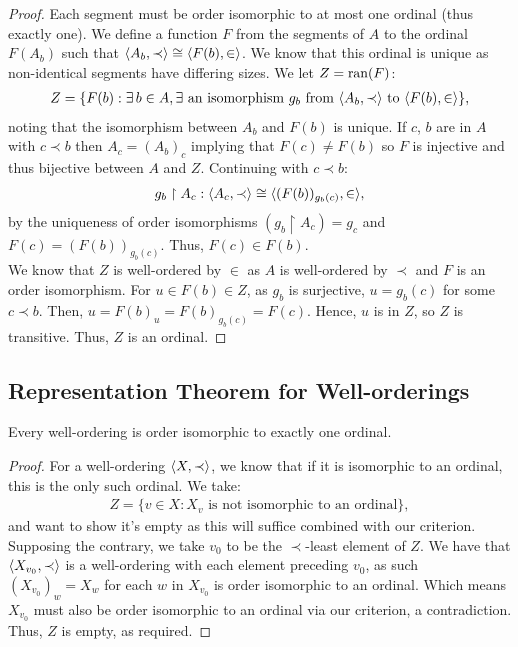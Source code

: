 \begin{proof}
    Each segment must be order isomorphic to at most one
    ordinal (thus exactly one). We define a function $F$ from
    the segments of $A$ to the ordinal $F(A_b)$ such
    that $\langle A_b, \prec \rangle \cong \langle F(b), \in \rangle$.
    We know that this ordinal is unique as non-identical
    segments have differing sizes.
    We let $Z = \operatorname{ran}(F)$: \begin{align*}
        Z = \{F(b) : \exists \, b \in A, 
        \exists \text{ an isomorphism } g_b 
        \text{ from } \langle A_b, \prec \rangle 
        \text{ to } \langle F(b), \in \rangle\},
    \end{align*} noting that the isomorphism between
    $A_b$ and $F(b)$ is unique. If $c$, $b$ are in $A$ with
    $c \prec b$ then $A_c = (A_b)_c$ implying that
    $F(c) \neq F(b)$ so $F$ is injective and thus bijective
    between $A$ and $Z$.
    Continuing with $c \prec b$: \begin{align*}
        g_b \upharpoonright A_c :
        \langle A_c, \prec \rangle \cong 
        \langle (F(b))_{g_b(c)}, \in \rangle,
    \end{align*} by the uniqueness of order isomorphisms
    $(g_b \upharpoonright A_c) = g_c$ and $F(c) = (F(b))_{g_b(c)}$.
    Thus, $F(c) \in F(b)$.
    \\[\baselineskip]
    We know that $Z$ is well-ordered by $\in$ as 
    $A$ is well-ordered by $\prec$ and $F$ is an
    order isomorphism. For $u \in F(b) \in Z$,
    as $g_b$ is surjective, $u = g_b(c)$ for some $c \prec b$.
    Then, $u = F(b)_u = F(b)_{g_b(c)} = F(c)$. Hence, $u$ is
    in $Z$, so $Z$ is transitive. Thus, $Z$ is an ordinal.
\end{proof}

\newpage

\subsection{Representation Theorem for Well-orderings}

Every well-ordering is order isomorphic to 
exactly one ordinal.

\begin{proof}
    For a well-ordering $\langle X, \prec \rangle$, we know that if it
    is isomorphic to an ordinal, this is the only such ordinal.
    We take: \begin{align*}
        Z = \{v \in X : X_v \text{ is not isomorphic to an ordinal}\},
    \end{align*} and want to show it's empty as this will suffice
    combined with our criterion. Supposing the
    contrary, we take $v_0$ to be the $\prec$-least element
    of $Z$. We have that $\langle X_{v_0}, \prec \rangle$ is a well-ordering
    with each element preceding $v_0$, as such $(X_{v_0})_w = X_w$
    for each $w$ in $X_{v_0}$ is order isomorphic to an ordinal.
    Which means $X_{v_0}$ must also be order isomorphic to an ordinal
    via our criterion, a contradiction. Thus, $Z$ is empty, as required.
\end{proof}

